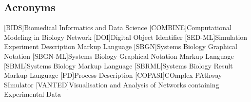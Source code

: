 \subsection*{Acronyms}
    \begin{acronym}[acrmeta]
        [BIDS]{Biomedical Informatics and Data Science}
        [COMBINE]{Computational Modeling in Biology Network}
        [DOI]{Digital Object Identifier}
        [SED-ML]{Simulation Experiment Description Markup Language}
        [SBGN]{Systems Biology Graphical Notation}
        [SBGN-ML]{Systems Biology Graphical Notation Markup Language}
        [SBML]{Systems Biology Markup Language}
        [SBRML]{Systems Biology Result Markup Language}
        [PD]{Process Description}
        [COPASI]{COmplex PAthway SImulator}
        [VANTED]{Visualisation and Analysis of Networks containing Experimental Data}
    \end{acronym}